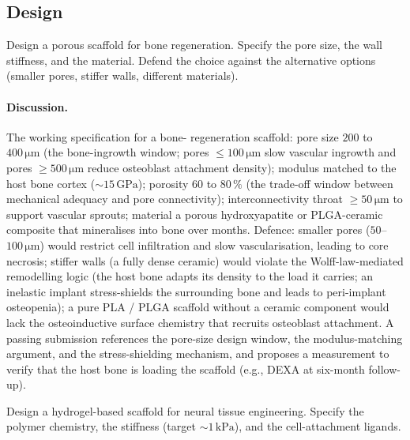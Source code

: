 \subsection*{Design}

\begin{exercise}
Design a porous scaffold for bone regeneration. Specify the pore
size, the wall stiffness, and the material. Defend the choice
against the alternative options (smaller pores, stiffer walls,
different materials).
\end{exercise}

\paragraph{Discussion.} The working specification for a bone-
regeneration scaffold: pore size $200$ to $400\,\si{\micro\meter}$
(the bone-ingrowth window; pores $\le 100\,\si{\micro\meter}$ slow
vascular ingrowth and pores $\ge 500\,\si{\micro\meter}$ reduce
osteoblast attachment density); modulus matched to the host bone
cortex ($\sim 15\,\text{GPa}$); porosity $60$ to $80\,\%$ (the
trade-off window between mechanical adequacy and pore
connectivity); interconnectivity throat $\ge 50\,\si{\micro\meter}$
to support vascular sprouts; material a porous hydroxyapatite or
PLGA-ceramic composite that mineralises into bone over months.
Defence: smaller pores ($50$--$100\,\si{\micro\meter}$) would
restrict cell infiltration and slow vascularisation, leading to
core necrosis; stiffer walls (a fully dense ceramic) would
violate the Wolff-law-mediated remodelling logic (the host bone
adapts its density to the load it carries; an inelastic implant
stress-shields the surrounding bone and leads to peri-implant
osteopenia); a pure PLA / PLGA scaffold without a ceramic
component would lack the osteoinductive surface chemistry that
recruits osteoblast attachment. A passing submission references
the pore-size design window, the modulus-matching argument, and
the stress-shielding mechanism, and proposes a measurement to
verify that the host bone is loading the scaffold (e.g., DEXA at
six-month follow-up).

\begin{exercise}
Design a hydrogel-based scaffold for neural tissue engineering.
Specify the polymer chemistry, the stiffness (target $\sim 1\,\text{kPa}$),
and the cell-attachment ligands.
\end{exercise}

